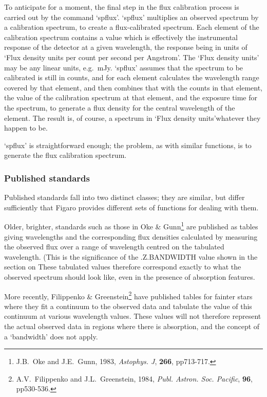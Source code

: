    To anticipate for a moment, the final step in the flux calibration
   process is carried out by the command `spflux'.  `spflux' multiplies
   an observed spectrum by a calibration spectrum, to create a
   flux-calibrated spectrum.  Each element of the calibration spectrum
   contains a value which is effectively the instrumental response of
   the detector at a given wavelength, the response being in units of
   `Flux density units per count per second per Angstrom'.  The `Flux
   density units' may be any linear units, e.g.\ mJy.  `spflux' assumes
   that the spectrum to be calibrated is still in counts, and for each
   element calculates the wavelength range covered by that element, and
   then combines that with the counts in that element, the value of the
   calibration spectrum at that element, and the exposure time for the
   spectrum, to generate a flux density for the central wavelength of
   the element.  The result is, of course, a spectrum in `Flux density
   units'\latorhtm{---}{-}whatever they happen to be.

   `spflux' is straightforward enough; the problem, as with similar
   functions, is to generate the flux calibration spectrum.


\subsubsection{\label{techno5published}Published standards}

   Published standards fall into two distinct classes; they are similar,
   but differ sufficiently that Figaro provides different sets of
   functions for dealing with them.

   Older, brighter, standards such as those in Oke \&
   Gunn\footnote{J.B.~Oke and J.E.~Gunn, 1983, {\it Astophys. J},
   {\bf 266}, pp713-717.}
   are published as tables giving wavelengths and the corresponding flux
   densities calculated by measuring the observed flux over a range of
   wavelength centred on the tabulated wavelength.  (This is the
   significance of the .Z.BANDWIDTH value shown in
   {the section on }
   These tabulated values therefore correspond exactly to what the
   observed spectrum should look like, even in the presence of
   absorption features.

   More recently, Filippenko \& Greenstein\footnote{A.V.~Filippenko and
   J.L.~Greenstein, 1984, {\it Publ. Astron. Soc. Pacific}, {\bf 96},
   pp530-536.} have published tables for fainter stars where they fit a
   continuum to the observed data and tabulate the value of this continuum
   at various wavelength values.  These values will not therefore represent
   the actual observed data in regions where there is absorption, and the
   concept of a `bandwidth' does not apply.

